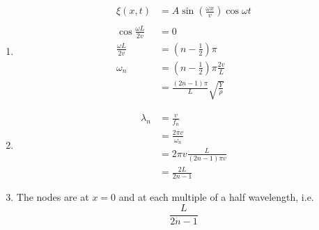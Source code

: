 \documentclass{article}
\begin{document}
\subsection{}

\begin{enumerate}
  \item

        \begin{align*}
          \xi(x, t)                 & = A \sin \left( \frac{\omega x}{v} \right) \cos \omega t \\ \\
          \cos \frac{\omega L}{2 v} & = 0                                                      \\
          \frac{\omega L}{2 v}      & = \left( n - \frac{1}{2} \right) \pi                     \\
          \omega_n                  & = \left( n - \frac{1}{2} \right) \pi \frac{2 v}{L}       \\
                                    & = \frac{(2 n - 1) \pi}{L} \sqrt{\frac{Y}{\rho}}
        \end{align*}

  \item

        \begin{align*}
          \lambda_n & = \frac{v}{f_n}                     \\
                    & = \frac{2 \pi v}{\omega_n}          \\
                    & = 2 \pi v \frac{L}{(2 n - 1) \pi v} \\
                    & = \frac{2 L}{2 n - 1}
        \end{align*}

  \item The nodes are at $x = 0$ and at each multiple of a half wavelength, i.e. \[\frac{L}{2 n - 1}\]
\end{enumerate}

\setcounter{subsection}{8}
\subsection{}
\end{document}

